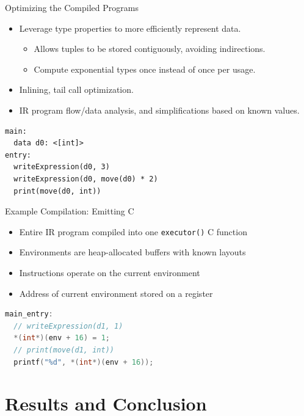 \documentclass{beamer}
\begin{document}
\begin{frame}[fragile]{Optimizing the Compiled Programs}
\begin{itemize}
  \item Leverage type properties to more efficiently represent data. \begin{itemize}
    \item Allows tuples to be stored contiguously, avoiding indirections. 
    \item Compute exponential types once instead of once per usage.
  \end{itemize}
  \item Inlining, tail call optimization.
  \item IR program flow/data analysis, and simplifications based on known values.
\end{itemize}
\begin{lstlisting}[language=IR]
main:
  data d0: <[int]>
entry:
  writeExpression(d0, 3)
  writeExpression(d0, move(d0) * 2)
  print(move(d0, int))
\end{lstlisting}
\end{frame}

\begin{frame}[fragile]{Example Compilation: Emitting C}
\vspace{-3mm}
\begin{itemize}
  \item Entire IR program compiled into one \texttt{executor()} C function
  \item Environments are heap-allocated buffers with known layouts
  \item Instructions operate on the current environment
  \item Address of current environment stored on a register
\end{itemize}
\begin{lstlisting}[language=C]
main_entry:
  // writeExpression(d1, 1)
  *(int*)(env + 16) = 1;
  // print(move(d1, int))
  printf("%d", *(int*)(env + 16));
\end{lstlisting}
\end{frame}

\section{Results and Conclusion}
\end{document}
